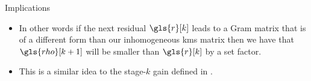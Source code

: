 \documentclass[aspectratio=169]{beamer}
\begin{document}
\begin{frame}{Implications}

    \begin{itemize}
        \item In other words if the next residual $\gls{r}[k]$ leads to a Gram matrix
            that is of a different form than our inhomogeneous \gls{kms} matrix then we
            have that $\gls{rho}[k+1]$ will be smaller than $\gls{r}[k]$ by a set
            factor.
        \item This is a similar idea to the stage-$k$ gain defined in \parencite{Evans2020}.
    \end{itemize}


\end{frame}
\end{document}
